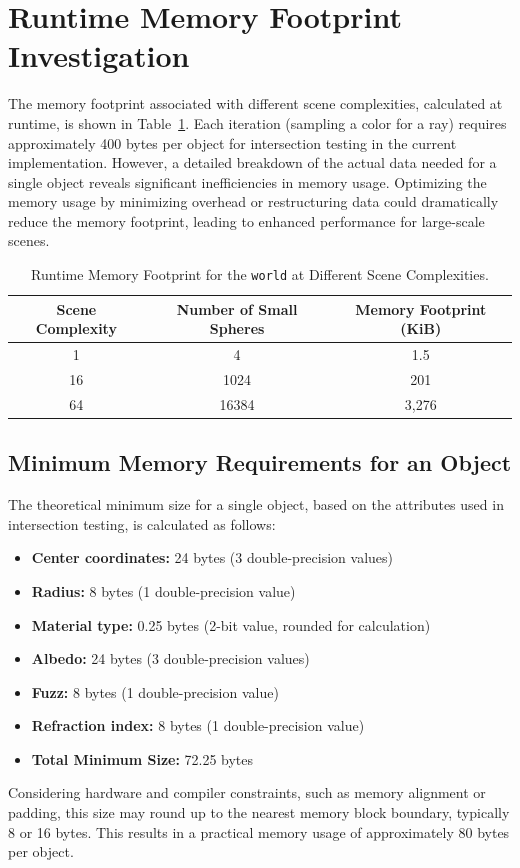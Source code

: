 \FloatBarrier
\section{Runtime Memory Footprint Investigation}
\label{sec:memory-footprint}

The memory footprint associated with different scene complexities, calculated at runtime, is shown in Table~\ref{tab:memory-footprint}. Each iteration (sampling a color for a ray) requires approximately 400 bytes per object for intersection testing in the current implementation. However, a detailed breakdown of the actual data needed for a single object reveals significant inefficiencies in memory usage. Optimizing the memory usage by minimizing overhead or restructuring data could dramatically reduce the memory footprint, leading to enhanced performance for large-scale scenes.

\begin{table}[htbp]
    \centering
    \small
    \begin{tabular}{|c|c|c|}
        \hline
        \textbf{Scene Complexity} & \textbf{Number of Small Spheres} & \textbf{Memory Footprint (KiB)} \\
        \hline
        1  & 4       & 1.5    \\
        16 & 1024    & 201    \\
        64 & 16384   & 3,276  \\
        \hline
    \end{tabular}
    \caption{Runtime Memory Footprint for the \texttt{world} at Different Scene Complexities.}
    \label{tab:memory-footprint}
\end{table}

\subsection{Minimum Memory Requirements for an Object}

The theoretical minimum size for a single object, based on the attributes used in intersection testing, is calculated as follows:
\begin{itemize}
    \item \textbf{Center coordinates:} 24 bytes (3 double-precision values)
    \item \textbf{Radius:} 8 bytes (1 double-precision value)
    \item \textbf{Material type:} 0.25 bytes (2-bit value, rounded for calculation)
    \item \textbf{Albedo:} 24 bytes (3 double-precision values)
    \item \textbf{Fuzz:} 8 bytes (1 double-precision value)
    \item \textbf{Refraction index:} 8 bytes (1 double-precision value)
    \item \textbf{Total Minimum Size:} 72.25 bytes
\end{itemize}

Considering hardware and compiler constraints, such as memory alignment or padding, this size may round up to the nearest memory block boundary, typically 8 or 16 bytes. This results in a practical memory usage of approximately 80 bytes per object.